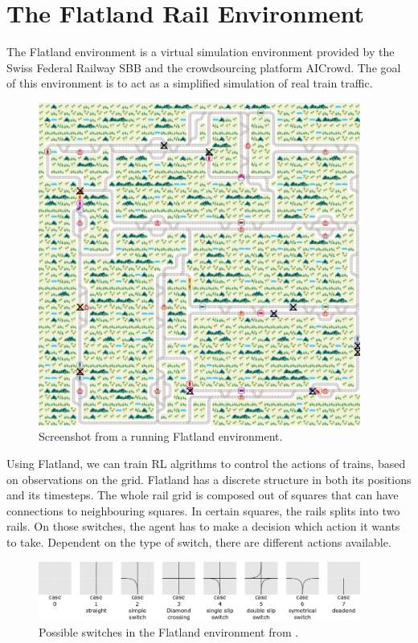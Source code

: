 \section{The Flatland Rail Environment}\label{flatland_intro}
The Flatland environment is a virtual simulation environment provided by the Swiss Federal Railway SBB and the crowdsourcing platform AICrowd.
The goal of this environment is to act as a simplified simulation of real train traffic.
\begin{figure}
	\centering
	\includegraphics[width=300pt]{images/screenshot_flatland.png}
	\caption{Screenshot from a running Flatland environment.}
\end{figure}
Using Flatland, we can train RL algrithms to control the actions of trains, based on observations on the grid. Flatland has a discrete structure in both its positions and its timesteps. The whole rail grid is composed out of squares that can have connections to neighbouring squares. In certain squares, the rails splits into two rails. On those switches, the agent has to make a decision which action it wants to take. Dependent on the type of switch, there are different actions available.
\begin{figure}
	\centering
	\includegraphics[width=300pt]{images/transition_nips_proposal.png}
	\caption{Possible switches in the Flatland environment from \cite{flatland_docu}.}
\end{figure}
